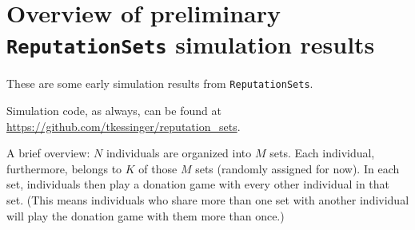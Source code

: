 \documentclass[13pt]{amsart}
\begin{document}
\section*{Overview of preliminary \texttt{ReputationSets} simulation results}

These are some early simulation results from \texttt{ReputationSets}.

Simulation code, as always, can be found at
\url{https://github.com/tkessinger/reputation_sets}.

A brief overview:
$N$ individuals are organized into $M$ sets.
Each individual, furthermore, belongs to $K$ of those $M$ sets (randomly assigned for now).
In each set, individuals then play a donation game with every other individual in that set.
(This means individuals who share more than one set with another individual will play the donation game with them more than once.)
\end{document}
